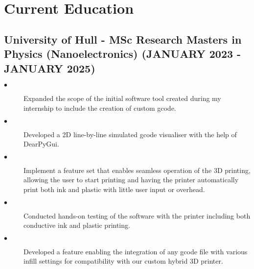 \documentclass{article}
\begin{document}
\section{Current Education}
\noindent
\begin{minipage}[t]{1\textwidth}
    \subsection{University of Hull \textnormal{- MSc Research Masters in Physics (Nanoelectronics)} \footnotesize{(JANUARY 2023 - JANUARY 2025)}}
    \normalsize{}
    \begin{description}
        \item[$\bullet$]Expanded the scope of the initial software tool created during my internship to include the creation of custom gcode. 
        \item[$\bullet$]Developed a 2D line-by-line simulated gcode visualiser with the help of DearPyGui.
        \item[$\bullet$]Implement a feature set that enables seamless operation of the 3D printing, allowing the user to start printing and having the printer automatically print both ink and plastic with little user input or overhead.
        \item[$\bullet$]Conducted hands-on testing of the software with the printer including both conductive ink and plastic printing.
        \item[$\bullet$]Developed a feature enabling the integration of any gcode file with various infill settings for compatibility with our custom hybrid 3D printer. 
    \end{description}
\end{minipage}
\end{document}
